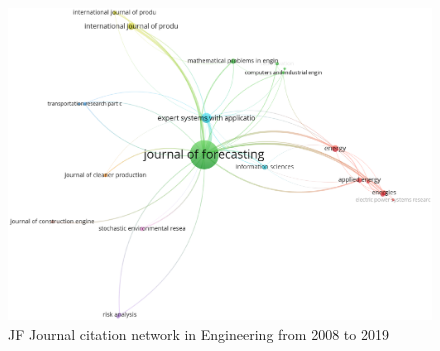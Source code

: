 \documentclass[11pt,a4paper]{elsarticle} %
\begin{document}
\begin{figure}[htbp]
\centering
\includegraphics[scale=0.3]{fig.28.eps}
\caption{JF Journal citation network in Engineering from 2008 to 2019}
\end{figure}
\end{document}

